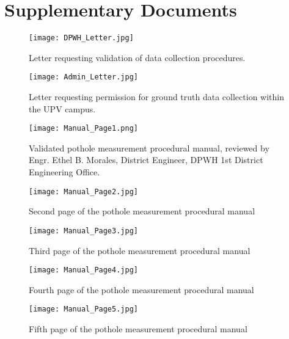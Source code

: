 \chapter{Supplementary Documents}
\label{sec:appendixd}


\begin{figure}[htbp]
	\centering
	\texttt{[image: DPWH\_Letter.jpg]}
	\caption{Letter requesting validation of data collection procedures.}
	\label{fig:validation_letter}
\end{figure}

\begin{figure}[htbp]
	\centering
	\texttt{[image: Admin\_Letter.jpg]}
	\caption{Letter requesting permission for ground truth data collection within the UPV campus.}
	\label{fig:permission_letter}
\end{figure}

\begin{figure}[htbp]
	\centering
	\texttt{[image: Manual\_Page1.png]}
	\caption{Validated pothole measurement procedural manual, reviewed by Engr. Ethel B. Morales, District Engineer, DPWH 1st District Engineering Office.}
	\label{fig:manual_page1}
\end{figure}

\begin{figure}[htbp]
	\centering
	\texttt{[image: Manual\_Page2.jpg]}
	\caption{Second page of the pothole measurement procedural manual}
	\label{fig:manual_page2}
\end{figure}

\begin{figure}[htbp]
	\centering
	\texttt{[image: Manual\_Page3.jpg]}
	\caption{Third page of the pothole measurement procedural manual}
	\label{fig:manual_page3}
\end{figure}

\begin{figure}[htbp]
	\centering
	\texttt{[image: Manual\_Page4.jpg]}
	\caption{Fourth page of the pothole measurement procedural manual}
	\label{fig:manual_page4}
\end{figure}

\begin{figure}[htbp]
	\centering
	\texttt{[image: Manual\_Page5.jpg]}
	\caption{Fifth page of the pothole measurement procedural manual}
	\label{fig:manual_page5}
\end{figure}


